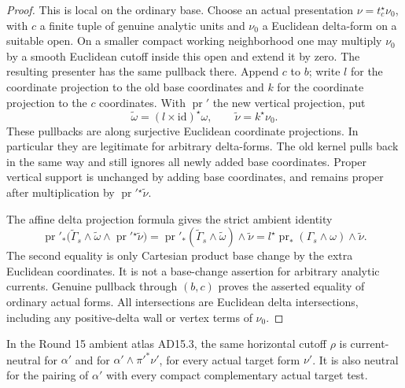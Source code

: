\begin{proof}
This is local on the ordinary base.  Choose an actual presentation
$\nu=t_c^\star\nu_0$, with $c$ a finite tuple of genuine analytic units
and $\nu_0$ a Euclidean delta-form on a suitable open.  On a smaller
compact working neighborhood one may multiply $\nu_0$ by a smooth
Euclidean cutoff inside this open and extend it by zero.  The
resulting presenter has the same pullback there.  Append $c$ to $b$;
write $l$ for the coordinate projection to the old base coordinates
and $k$ for the coordinate projection to the $c$ coordinates.
With $\operatorname{pr}'$ the new vertical projection, put
\[
 \widetilde\omega=(l\times\mathrm{id})^\star\omega,
 \qquad \widetilde\nu=k^\star\nu_0.
\]
These pullbacks are along surjective Euclidean coordinate projections.
In particular they are legitimate for arbitrary delta-forms.  The
old kernel pulls back in the same way and still ignores all newly
added base coordinates.  Proper vertical support is unchanged by
adding base coordinates, and remains proper after multiplication
by $\operatorname{pr}'{}^\star\widetilde\nu$.

The affine delta projection formula gives the strict ambient identity
\[
 \operatorname{pr}'_*
  \bigl(\widetilde\Gamma_s\wedge\widetilde\omega
               \wedge\operatorname{pr}'{}^\star\widetilde\nu\bigr)
   =\operatorname{pr}'_*
        (\widetilde\Gamma_s\wedge\widetilde\omega)
                  \wedge\widetilde\nu
   =l^\star\operatorname{pr}_*(\Gamma_s\wedge\omega)
                  \wedge\widetilde\nu.
 \tag{OUT16.2}\label{r16out:ambient-projection}
\]
The second equality is only Cartesian product base change by the
extra Euclidean coordinates.  It is not a base-change assertion for
arbitrary analytic currents.  Genuine pullback through $(b,c)$
proves the asserted equality of ordinary actual forms.  All
intersections are Euclidean delta intersections, including any
positive-delta wall or vertex terms of $\nu_0$.
\end{proof}

\begin{lemma}
\label{r16out:excision}
In the Round 15 ambient atlas AD15.3, the same horizontal cutoff
$\rho$ is current-neutral for $\alpha'$ and for
$\alpha'\wedge\pi'^*\nu'$, for every actual target form $\nu'$.
It is also neutral for the pairing of $\alpha'$ with every compact
complementary actual target test.
\end{lemma}

